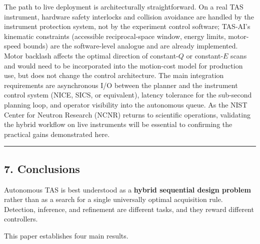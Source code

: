 \documentclass[
]{article}
\begin{document}
The path to live deployment is architecturally straightforward. On a
real TAS instrument, hardware safety interlocks and collision avoidance
are handled by the instrument protection system, not by the experiment
control software; TAS-AI's kinematic constraints (accessible
reciprocal-space window, energy limits, motor-speed bounds) are the
software-level analogue and are already implemented. Motor backlash
affects the optimal direction of constant-\(Q\) or constant-\(E\) scans
and would need to be incorporated into the motion-cost model for
production use, but does not change the control architecture. The main
integration requirements are asynchronous I/O between the planner and
the instrument control system (NICE, SICS, or equivalent), latency
tolerance for the sub-second planning loop, and operator visibility into
the autonomous queue. As the NIST Center for Neutron Research (NCNR)
returns to scientific operations, validating the hybrid workflow on live
instruments will be essential to confirming the practical gains
demonstrated here.

\begin{center}\rule{0.5\linewidth}{0.5pt}\end{center}

\hypertarget{conclusions}{%
\subsection{7. Conclusions}\label{conclusions}}

Autonomous TAS is best understood as a \textbf{hybrid sequential design
problem} rather than as a search for a single universally optimal
acquisition rule. Detection, inference, and refinement are different
tasks, and they reward different controllers.

This paper establishes four main results.
\end{document}
